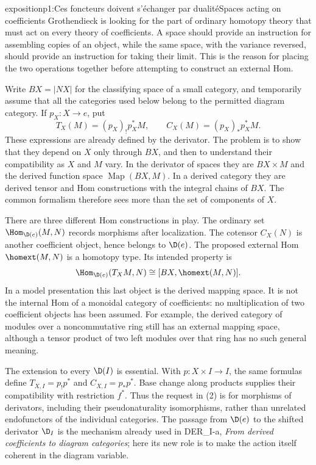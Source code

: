 
\begin{dcomment}{exposition}{p1:Ces foncteurs doivent s'échanger par dualité}{Spaces acting on coefficients}
Grothendieck is looking for the part of ordinary homotopy theory that must act on every theory of coefficients. A space should provide an instruction for assembling copies of an object, while the same space, with the variance reversed, should provide an instruction for taking their limit. This is the reason for placing the two operations together before attempting to construct an external Hom.

Write \(B X=|N X|\) for the classifying space of a small category, and temporarily assume that all the categories used below belong to the permitted diagram category. If \(p_X:X\to e\), put
\[
 T_X(M)=(p_X)_!p_X^*M,\qquad
 C_X(M)=(p_X)_*p_X^*M.
\]
These expressions are already defined by the derivator. The problem is to show that they depend on \(X\) only through \(B X\), and then to understand their compatibility as \(X\) and \(M\) vary. In the derivator of spaces they are \(B X\times M\) and the derived function space \(\operatorname{Map}(B X,M)\). In a derived category they are derived tensor and Hom constructions with the integral chains of \(B X\). The common formalism therefore sees more than the set of components of \(X\).

There are three different Hom constructions in play. The ordinary set \(\Hom_{\D(e)}(M,N)\) records morphisms after localization. The cotensor \(C_X(N)\) is another coefficient object, hence belongs to \(\D(e)\). The proposed external Hom \(\homext(M,N)\) is a homotopy type. Its intended property is
\[
 \Hom_{\D(e)}(T_XM,N)
 \cong [B X,\homext(M,N)].
\]
In a model presentation this last object is the derived mapping space. It is not the internal Hom of a monoidal category of coefficients: no multiplication of two coefficient objects has been assumed. For example, the derived category of modules over a noncommutative ring still has an external mapping space, although a tensor product of two left modules over that ring has no such general meaning.

The extension to every \(\D(I)\) is essential. With \(p:X\times I\to I\), the same formulas define \(T_{X,I}=p_!p^*\) and \(C_{X,I}=p_*p^*\). Base change along products supplies their compatibility with restriction \(f^*\). Thus the request in (2) is for morphisms of derivators, including their pseudonaturality isomorphisms, rather than unrelated endofunctors of the individual categories. The passage from \(\D(e)\) to the shifted derivator \(\D_I\) is the mechanism already used in DER\_I-a, \emph{From derived coefficients to diagram categories}; here its new role is to make the action itself coherent in the diagram variable.


\end{dcomment}
